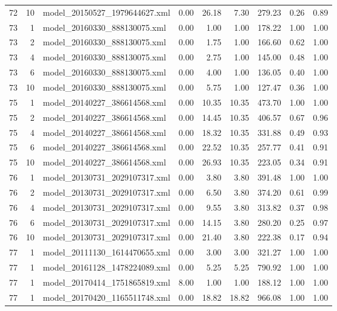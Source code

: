 \begin{table}[ht]
\begin{tabular}{rrlrrrrrr}
   72 &  10 & model\_20150527\_1979644627.xml & 0.00 & 26.18 & 7.30 & 279.23 & 0.26 & 0.89 \\ 
   73 &   1 & model\_20160330\_888130075.xml & 0.00 & 1.00 & 1.00 & 178.22 & 1.00 & 1.00 \\ 
   73 &   2 & model\_20160330\_888130075.xml & 0.00 & 1.75 & 1.00 & 166.60 & 0.62 & 1.00 \\ 
   73 &   4 & model\_20160330\_888130075.xml & 0.00 & 2.75 & 1.00 & 145.00 & 0.48 & 1.00 \\ 
   73 &   6 & model\_20160330\_888130075.xml & 0.00 & 4.00 & 1.00 & 136.05 & 0.40 & 1.00 \\ 
   73 &  10 & model\_20160330\_888130075.xml & 0.00 & 5.75 & 1.00 & 127.47 & 0.36 & 1.00 \\ 
   75 &   1 & model\_20140227\_386614568.xml & 0.00 & 10.35 & 10.35 & 473.70 & 1.00 & 1.00 \\ 
   75 &   2 & model\_20140227\_386614568.xml & 0.00 & 14.45 & 10.35 & 406.57 & 0.67 & 0.96 \\ 
   75 &   4 & model\_20140227\_386614568.xml & 0.00 & 18.32 & 10.35 & 331.88 & 0.49 & 0.93 \\ 
   75 &   6 & model\_20140227\_386614568.xml & 0.00 & 22.52 & 10.35 & 257.77 & 0.41 & 0.91 \\ 
   75 &  10 & model\_20140227\_386614568.xml & 0.00 & 26.93 & 10.35 & 223.05 & 0.34 & 0.91 \\ 
   76 &   1 & model\_20130731\_2029107317.xml & 0.00 & 3.80 & 3.80 & 391.48 & 1.00 & 1.00 \\ 
   76 &   2 & model\_20130731\_2029107317.xml & 0.00 & 6.50 & 3.80 & 374.20 & 0.61 & 0.99 \\ 
   76 &   4 & model\_20130731\_2029107317.xml & 0.00 & 9.55 & 3.80 & 313.82 & 0.37 & 0.98 \\ 
   76 &   6 & model\_20130731\_2029107317.xml & 0.00 & 14.15 & 3.80 & 280.20 & 0.25 & 0.97 \\ 
   76 &  10 & model\_20130731\_2029107317.xml & 0.00 & 21.40 & 3.80 & 222.38 & 0.17 & 0.94 \\ 
   77 &   1 & model\_20111130\_1614470655.xml & 0.00 & 3.00 & 3.00 & 321.27 & 1.00 & 1.00 \\ 
   77 &   1 & model\_20161128\_1478224089.xml & 0.00 & 5.25 & 5.25 & 790.92 & 1.00 & 1.00 \\ 
   77 &   1 & model\_20170414\_1751865819.xml & 8.00 & 1.00 & 1.00 & 188.12 & 1.00 & 1.00 \\ 
   77 &   1 & model\_20170420\_1165511748.xml & 0.00 & 18.82 & 18.82 & 966.08 & 1.00 & 1.00 \\ 

\end{tabular}
\end{table}

